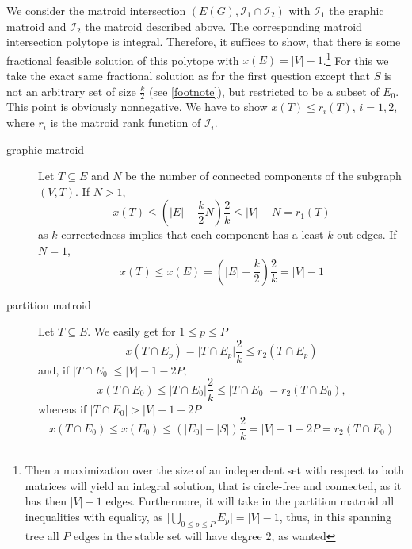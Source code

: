 \documentclass{scrartcl}
\newcommand\1{\mathbf{1}}
\begin{document}
\begin{enumerate}
We consider the matroid intersection $(E(G), \mathcal{I}_1\cap \mathcal{I}_2)$ with $\mathcal{I}_1$ the graphic matroid and $\mathcal{I}_2$ the matroid described above. The corresponding matroid intersection polytope is integral. Therefore, it suffices to show, that there is some fractional feasible solution of this polytope with $x(E) = \lvert V \rvert-1$.\footnote{Then a maximization over the size of an independent set with respect to both matrices will yield an integral solution, that is circle-free and connected, as it has then $\lvert V \rvert-1$ edges. Furthermore, it will take in the partition matroid all inequalities with equality, as $\lvert \bigcup_{0\le p \le P} E_p \rvert = \lvert V\rvert-1$, thus, in this spanning tree all $P$ edges in the stable set will have degree $2$, as wanted} For this we take the exact same fractional solution as for the first question except that $S$ is not an arbitrary set of size $\frac{k}{2}$ (see \autoref{footnote}), but restricted to be a subset of $E_0$. This point is obviously nonnegative. We have to show $x(T) \le r_i(T)$, $i=1, 2$, where $r_i$ is the matroid rank function of $\mathcal{I}_i$. 
\begin{description}
\item[graphic matroid]
Let $T\subseteq E$ and $N$ be the number of connected components of the subgraph $(V,T)$. If $N > 1$,
\[
x(T) \leq \left(\lvert E\rvert - \frac{k}{2} N\right)\frac{2}{k} \leq \lvert V\rvert - N = r_1(T)
\]
as $k$-correctedness implies that each component has a least $k$ out-edges. If $N= 1$,
\[
x(T) \leq x(E) = \left(\lvert E\rvert - \frac{k}{2}\right) \frac{2}{k} = |V| - 1
\]
\item[partition matroid]
Let $T\subseteq E$. We easily get for $1 \leq p \leq P$
\[ 
x(T\cap E_p) = \lvert T\cap E_p\rvert \frac{2}{k} \leq r_2(T\cap E_p)
\]
and, if $\lvert T\cap E_0\rvert \le \lvert V\rvert - 1 - 2 P$,
\[
x(T\cap E_0)  \leq \lvert T\cap E_0\rvert \frac{2}{k} \leq \lvert T \cap E_0\rvert = r_2(T\cap E_0), 
\]
whereas if $\lvert T\cap E_0\rvert > \lvert V\rvert - 1 - 2 P$
\[
x(T\cap E_0)  \leq x(E_0) \leq (\lvert E_0\rvert - \lvert S\rvert)  \frac{2}{k} = \lvert V\rvert - 1 - 2  P = r_2(T \cap E_0)
\]
\end{description}
\end{enumerate}
\end{document}

